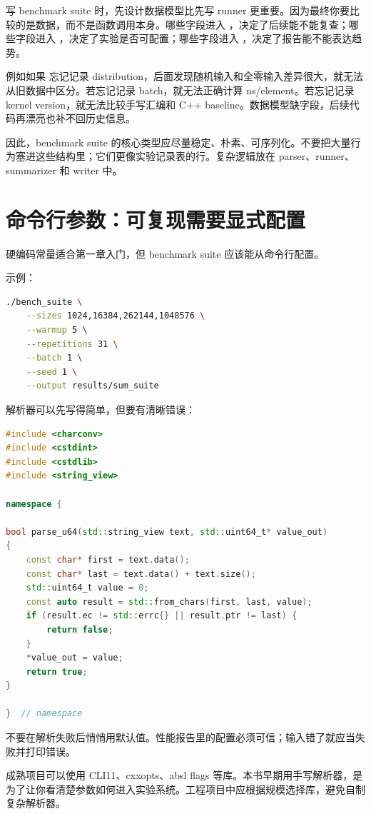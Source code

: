 写 benchmark suite 时，先设计数据模型比先写 runner 更重要。因为最终你要比较的是数据，而不是函数调用本身。哪些字段进入 ，决定了后续能不能复查；哪些字段进入 ，决定了实验是否可配置；哪些字段进入 ，决定了报告能不能表达趋势。

例如如果  忘记记录 distribution，后面发现随机输入和全零输入差异很大，就无法从旧数据中区分。若忘记记录 batch，就无法正确计算 ns/element。若忘记记录 kernel version，就无法比较手写汇编和 C++ baseline。数据模型缺字段，后续代码再漂亮也补不回历史信息。

因此，benchmark suite 的核心类型应尽量稳定、朴素、可序列化。不要把大量行为塞进这些结构里；它们更像实验记录表的行。复杂逻辑放在 parser、runner、summarizer 和 writer 中。

\section{命令行参数：可复现需要显式配置}

硬编码常量适合第一章入门，但 benchmark suite 应该能从命令行配置。

示例：

\begin{lstlisting}[language=bash]
./bench_suite \
    --sizes 1024,16384,262144,1048576 \
    --warmup 5 \
    --repetitions 31 \
    --batch 1 \
    --seed 1 \
    --output results/sum_suite
\end{lstlisting}

解析器可以先写得简单，但要有清晰错误：

\begin{lstlisting}[language=C++]
#include <charconv>
#include <cstdint>
#include <cstdlib>
#include <string_view>

namespace {

bool parse_u64(std::string_view text, std::uint64_t* value_out)
{
    const char* first = text.data();
    const char* last = text.data() + text.size();
    std::uint64_t value = 0;
    const auto result = std::from_chars(first, last, value);
    if (result.ec != std::errc{} || result.ptr != last) {
        return false;
    }
    *value_out = value;
    return true;
}

}  // namespace
\end{lstlisting}

不要在解析失败后悄悄用默认值。性能报告里的配置必须可信；输入错了就应当失败并打印错误。

\begin{deepdive}
成熟项目可以使用 CLI11、cxxopts、absl flags 等库。本书早期用手写解析器，是为了让你看清楚参数如何进入实验系统。工程项目中应根据规模选择库，避免自制复杂解析器。
\end{deepdive}

